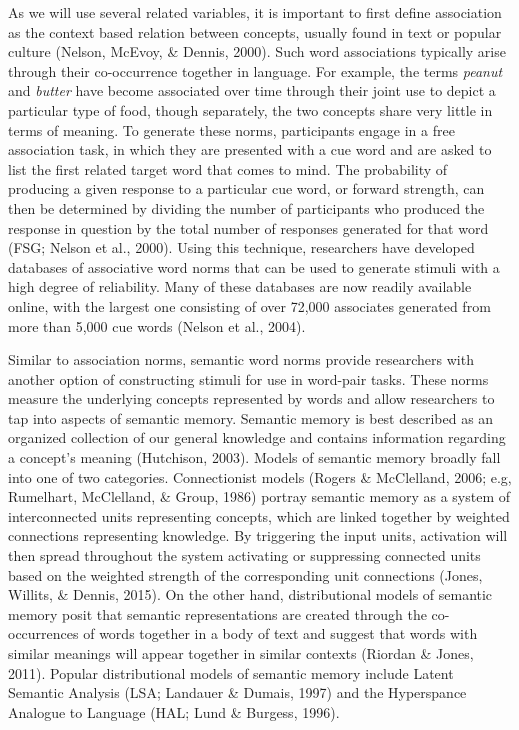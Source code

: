 \documentclass[english,man]{apa6}
\theoremstyle{definition}
\theoremstyle{definition}
\theoremstyle{definition}
\theoremstyle{remark}
\begin{document}
As we will use several related variables, it is important to first
define association as the context based relation between concepts,
usually found in text or popular culture (Nelson, McEvoy, \& Dennis,
2000). Such word associations typically arise through their
co-occurrence together in language. For example, the terms \emph{peanut}
and \emph{butter} have become associated over time through their joint
use to depict a particular type of food, though separately, the two
concepts share very little in terms of meaning. To generate these norms,
participants engage in a free association task, in which they are
presented with a cue word and are asked to list the first related target
word that comes to mind. The probability of producing a given response
to a particular cue word, or forward strength, can then be determined by
dividing the number of participants who produced the response in
question by the total number of responses generated for that word (FSG;
Nelson et al., 2000). Using this technique, researchers have developed
databases of associative word norms that can be used to generate stimuli
with a high degree of reliability. Many of these databases are now
readily available online, with the largest one consisting of over 72,000
associates generated from more than 5,000 cue words (Nelson et al.,
2004).

Similar to association norms, semantic word norms provide researchers
with another option of constructing stimuli for use in word-pair tasks.
These norms measure the underlying concepts represented by words and
allow researchers to tap into aspects of semantic memory. Semantic
memory is best described as an organized collection of our general
knowledge and contains information regarding a concept's meaning
(Hutchison, 2003). Models of semantic memory broadly fall into one of
two categories. Connectionist models (Rogers \& McClelland, 2006; e.g,
Rumelhart, McClelland, \& Group, 1986) portray semantic memory as a
system of interconnected units representing concepts, which are linked
together by weighted connections representing knowledge. By triggering
the input units, activation will then spread throughout the system
activating or suppressing connected units based on the weighted strength
of the corresponding unit connections (Jones, Willits, \& Dennis, 2015).
On the other hand, distributional models of semantic memory posit that
semantic representations are created through the co-occurrences of words
together in a body of text and suggest that words with similar meanings
will appear together in similar contexts (Riordan \& Jones, 2011).
Popular distributional models of semantic memory include Latent Semantic
Analysis (LSA; Landauer \& Dumais, 1997) and the Hyperspance Analogue to
Language (HAL; Lund \& Burgess, 1996).
\end{document}

